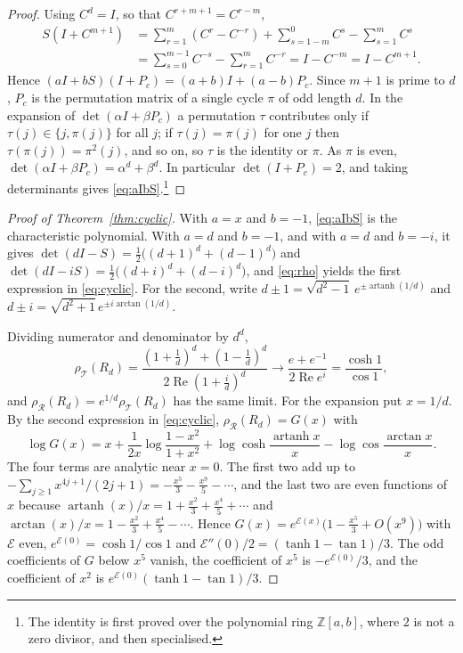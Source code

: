 \documentclass[11pt,a4paper,reqno]{amsart}
\theoremstyle{remark}
\numberwithin{equation}{section}
\newcommand{\artanh}{\operatorname{artanh}}
\newcommand{\cT}{\mathcal{T}}
\newcommand{\cR}{\mathcal{R}}
\newcommand{\Z}{\mathbb{Z}}
\begin{document}
\begin{proof}
Using $C^d=I$, so that $C^{r+m+1}=C^{r-m}$,
\begin{align*}
S(I+C^{m+1})&=\sum_{r=1}^m(C^r-C^{-r})+\sum_{s=1-m}^{0}C^{s}-\sum_{s=1}^{m}C^{s}\\
&=\sum_{s=0}^{m-1}C^{-s}-\sum_{r=1}^mC^{-r}=I-C^{-m}=I-C^{m+1}.
\end{align*}
Hence $(aI+bS)(I+P_c)=(a+b)I+(a-b)P_c$. Since $m+1$ is prime to $d$, $P_c$ is the permutation matrix of a single cycle $\pi$ of odd length $d$. In the expansion of $\det(\alpha I+\beta P_c)$ a permutation $\tau$ contributes only if $\tau(j)\in\{j,\pi(j)\}$ for all $j$; if $\tau(j)=\pi(j)$ for one $j$ then $\tau(\pi(j))=\pi^2(j)$, and so on, so $\tau$ is the identity or $\pi$. As $\pi$ is even, $\det(\alpha I+\beta P_c)=\alpha^d+\beta^d$. In particular $\det(I+P_c)=2$, and taking determinants gives \eqref{eq:aIbS}.\footnote{The identity is first proved over the polynomial ring $\Z[a,b]$, where $2$ is not a zero divisor, and then specialised.}
\end{proof}

\begin{proof}[Proof of Theorem~\ref{thm:cyclic}]
With $a=x$ and $b=-1$, \eqref{eq:aIbS} is the characteristic polynomial. With $a=d$ and $b=-1$, and with $a=d$ and $b=-i$, it gives $\det(dI-S)=\frac12\bigl((d+1)^d+(d-1)^d\bigr)$ and $\det(dI-iS)=\frac12\bigl((d+i)^d+(d-i)^d\bigr)$, and \eqref{eq:rho} yields the first expression in \eqref{eq:cyclic}. For the second, write $d\pm1=\sqrt{d^2-1}\,e^{\pm\artanh(1/d)}$ and $d\pm i=\sqrt{d^2+1}\,e^{\pm i\arctan(1/d)}$.

Dividing numerator and denominator by $d^d$,
\[
\rho_\cT(R_d)=\frac{(1+\frac1d)^d+(1-\frac1d)^d}{2\operatorname{Re}(1+\frac id)^d}\longrightarrow\frac{e+e^{-1}}{2\operatorname{Re}e^{i}}=\frac{\cosh1}{\cos1},
\]
and $\rho_\cR(R_d)=e^{1/d}\rho_\cT(R_d)$ has the same limit. For the expansion put $x=1/d$. By the second expression in \eqref{eq:cyclic}, $\rho_\cR(R_d)=G(x)$ with
\[
\log G(x)=x+\frac1{2x}\log\frac{1-x^2}{1+x^2}+\log\cosh\frac{\artanh x}{x}-\log\cos\frac{\arctan x}{x}.
\]
The four terms are analytic near $x=0$. The first two add up to $-\sum_{j\ge1}x^{4j+1}/(2j+1)=-\frac{x^5}{3}-\frac{x^9}{5}-\cdots$, and the last two are even functions of $x$ because $\artanh(x)/x=1+\frac{x^2}3+\frac{x^4}5+\cdots$ and $\arctan(x)/x=1-\frac{x^2}3+\frac{x^4}5-\cdots$. Hence $G(x)=e^{\mathcal E(x)}\bigl(1-\frac{x^5}{3}+O(x^9)\bigr)$ with $\mathcal E$ even, $e^{\mathcal E(0)}=\cosh1/\cos1$ and $\mathcal E''(0)/2=(\tanh1-\tan1)/3$. The odd coefficients of $G$ below $x^5$ vanish, the coefficient of $x^5$ is $-e^{\mathcal E(0)}/3$, and the coefficient of $x^2$ is $e^{\mathcal E(0)}(\tanh1-\tan1)/3$.
\end{proof}
\end{document}
